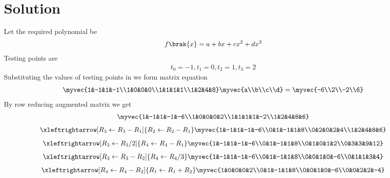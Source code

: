 \documentclass[journal,12pt,twocolumn]{IEEEtran}
\begin{document}
\section{Solution}
Let the required polynomial be 
\begin{align}
    f\brak{x}=a+bx+c x^{2}+d x^{3} \label{1}
\end{align} 
Testing points are 
\begin{align}
    t_0=-1 , t_1=0 , t_2=1 , t_3=2 
\end{align}
Substituting the values of testing points in  we form matrix equation 
\begin{align}
    \myvec{1&-1&1&-1\\1&0&0&0\\1&1&1&1\\1&2&4&8}\myvec{a\\b\\c\\d}=\myvec{-6\\2\\-2\\6}
\end{align}
By row reducing augmented matrix we get
\begin{align}
   \myvec{1&-1&1&-1&-6\\1&0&0&0&2\\1&1&1&1&-2\\1&2&4&8&6}
\end{align}
\begin{align}
\xleftrightarrow[R_3\leftarrow R_3-R_1]{R_2\leftarrow R_2-R_1}
\myvec{1&-1&1&-1&-6\\0&1&-1&1&8\\0&2&0&2&4\\1&2&4&8&6}
\end{align}
\begin{align}
\xleftrightarrow[R_3\leftarrow R_3/2]{R_4\leftarrow R_4-R_1}
\myvec{1&-1&1&-1&-6\\0&1&-1&1&8\\0&1&0&1&2\\0&3&3&9&12}
\end{align}
\begin{align}
\xleftrightarrow[R_3\leftarrow R_3-R_2]{R_4\leftarrow R_4/3}
\myvec{1&-1&1&-1&-6\\0&1&-1&1&8\\0&0&1&0&-6\\0&1&1&3&4}
\end{align}
\begin{align}
\xleftrightarrow[R_4\leftarrow R_4-R_2]{R_1\leftarrow R_1+R_2}
\myvec{1&0&0&0&2\\0&1&-1&1&8\\0&0&1&0&-6\\0&0&2&2&-4}
\end{align}
\end{document}
